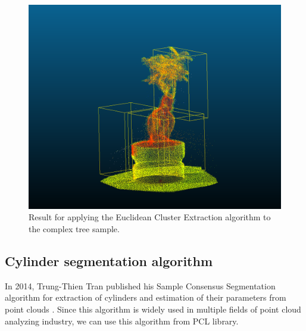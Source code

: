 \documentclass[runningheads,a4paper]{llncs}
\begin{document}
\begin{figure}
\centering
\includegraphics[scale=0.6]{Euclidean-cluster-extraction-result.png}
\caption{Result for applying the Euclidean Cluster Extraction algorithm to the complex tree sample.}
\label{fig:Euclidean-cluster}
\end{figure}

\subsection{Cylinder segmentation algorithm}
In 2014, Trung-Thien Tran published his Sample Consensus Segmentation algorithm for extraction of cylinders and estimation of their parameters from point clouds \cite{10}. Since this algorithm is widely used in multiple fields of point cloud analyzing industry, we can use this algorithm from PCL library.
\end{document}
